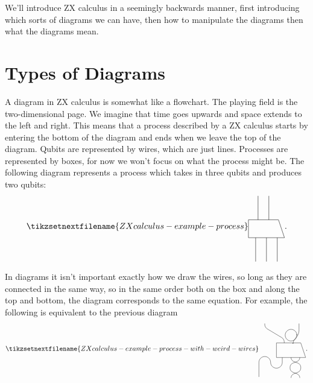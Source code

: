 \documentclass[fleqn]{NotesClass}
\begin{document}
    We'll introduce ZX calculus in a seemingly backwards manner, first introducing which sorts of diagrams we can have, then how to manipulate the diagrams then what the diagrams mean.
    
    \section{Types of Diagrams}
    A diagram in ZX calculus is somewhat like a flowchart.
    The playing field is the two-dimensional page.
    We imagine that time goes upwards and space extends to the left and right.
    This means that a process described by a ZX calculus starts by entering the bottom of the diagram and ends when we leave the top of the diagram.
    Qubits are represented by wires, which are just lines.
    Processes are represented by boxes, for now we won't focus on what the process might be.
    The following diagram represents a process which takes in three qubits and produces two qubits:
    \begin{equation}
        \tikzsetnextfilename{ZXcalculus-example-process}
        \begin{tikzpicture}[baseline=(current bounding box)]
            \draw (0, 0) -- ++ (1.5, 0) -- ++ (-0.25, 0.75) -- ++ (-1.25, 0) -- cycle;
            \draw (0.3, 0) -- ++ (0, -1);
            \draw (0.75, 0) -- ++ (0, -1);
            \draw (1.2, 0) -- ++ (0, -1);
            \draw (0.4, 0.75) -- ++ (0, 1);
            \draw (0.85, 0.75) -- ++ (0, 1);
        \end{tikzpicture}
        .
    \end{equation}
    
    In diagrams it isn't important exactly how we draw the wires, so long as they are connected in the same way, so in the same order both on the box and along the top and bottom, the diagram corresponds to the same equation.
    For example, the following is equivalent to the previous diagram
    \begin{equation}
        \tikzsetnextfilename{ZXcalculus-example-process-with-weird-wires}
        \begin{tikzpicture}[baseline=(current bounding box)]
            \draw (0, 0) -- ++ (1.5, 0) -- ++ (-0.25, 0.75) -- ++ (-1.25, 0) -- cycle;
            \draw (0.3, 0) -- ++ (0, -0.25) arc (0:-180:0.3) arc (0:180:0.3) -- ++ (0, -0.75);
            \draw[rounded corners] (0.75, 0) -- ++ (0, -0.15) -- ++ (0.5, -0.2) -- ++ (0, -0.35) -- ++ (-0.5, -0.2) -- ++ (0, -0.15);
            \draw[rounded corners] (1.2, 0) -- ++ (0, -0.15) -- ++ (-0.5, -0.2) -- ++ (0, -0.35) -- ++ (0.5, -0.2) -- ++ (0, -0.15);
            \draw[rounded corners] (0.4, 0.75) -- ++ (0, 0.2) -- ++ (-1, 0.6) -- ++ (0, 0.2);
            \draw[rounded corners] (0.85, 0.75) -- ++ (0, 0.1) -- ++ (0.2, 0.2) -- ++ (0, 0.1) coordinate (A);
            \draw (A) arc (0:330:0.3) coordinate (B);
            \draw[rounded corners] (B) -- ++ (0.15, 0.25) -- ++ (0, 0.5);
        \end{tikzpicture}
        .
    \end{equation}
    
\end{document}
